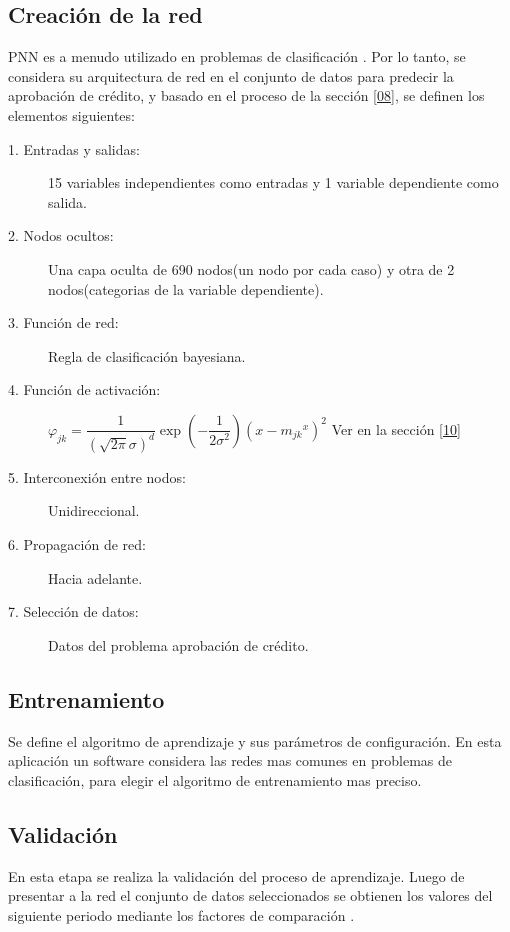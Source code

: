 \documentclass[11pt,titlepage]{report}
\begin{document}
\subsection{Creación de la red}
PNN es a menudo utilizado en problemas de clasificación \cite{Int08}. Por lo tanto, se considera su arquitectura de red en el conjunto de datos para predecir la aprobación de crédito, y basado en el proceso de la sección \ref{08}, se definen los elementos siguientes:
\begin{description}
	\item[1. Entradas y salidas:] 15 variables independientes como entradas y 1 variable dependiente como salida.
	
	\item[2. Nodos ocultos:] Una capa oculta de 690 nodos(un nodo por cada caso) y otra de 2 nodos(categorias de la variable dependiente).  
	
	\item[3. Función de red:] Regla de clasificación bayesiana. 
	
	\item[4. Función de activación:] $ \varphi_{jk} = \dfrac{1}{(\sqrt{2\pi}\sigma)^d} \exp{(-\dfrac{1}{2\sigma^2})(x-{m_{jk}}^x)^2} $
	Ver en la sección \ref{10}
	\item[5. Interconexión entre nodos:] Unidireccional.
	\item[6. Propagación de red:] Hacia adelante. 
	\item[7. Selección de datos:] Datos del problema aprobación de crédito.
\end{description}

\subsection{Entrenamiento}
Se define el algoritmo de aprendizaje y sus parámetros de configuración. En esta aplicación un software considera las redes mas comunes en problemas de clasificación, para elegir el algoritmo de entrenamiento mas preciso. 

\subsection{Validación}
En esta etapa se realiza la validación del proceso de aprendizaje. Luego de presentar a la red el conjunto de datos seleccionados se obtienen los valores del siguiente periodo mediante los factores de comparación \cite{Art01}.
\end{document}
